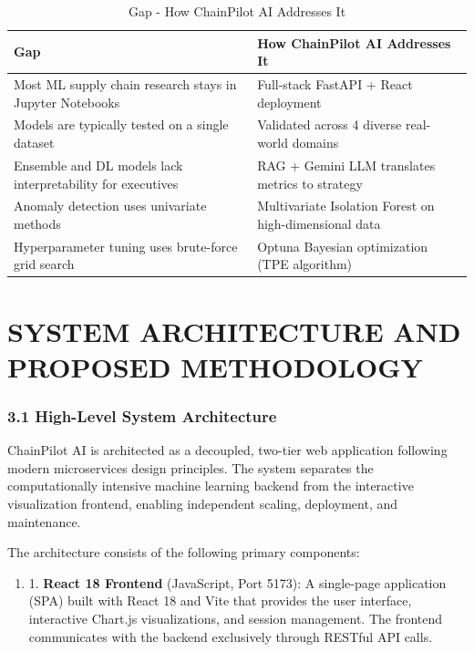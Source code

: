 \documentclass[12pt, a4paper]{report}
\begin{document}
\begin{table}[H]
\centering
\caption{Gap - How ChainPilot AI Addresses It}
\vspace{0.1in}
\begin{tabularx}{\textwidth}{|>{\raggedright\arraybackslash}X|>{\raggedright\arraybackslash}X|}
\hline
Gap & How ChainPilot AI Addresses It \\ \hline
\hline
Most ML supply chain research stays in Jupyter Notebooks & Full-stack FastAPI + React deployment \\ \hline
Models are typically tested on a single dataset & Validated across 4 diverse real-world domains \\ \hline
Ensemble and DL models lack interpretability for executives & RAG + Gemini LLM translates metrics to strategy \\ \hline
Anomaly detection uses univariate methods & Multivariate Isolation Forest on high-dimensional data \\ \hline
Hyperparameter tuning uses brute-force grid search & Optuna Bayesian optimization (TPE algorithm) \\ \hline
\end{tabularx}
\end{table}


\clearpage

\chapter{SYSTEM ARCHITECTURE AND PROPOSED METHODOLOGY}

\subsection{3.1 High-Level System Architecture}

ChainPilot AI is architected as a decoupled, two-tier web application following modern microservices design principles. The system separates the computationally intensive machine learning backend from the interactive visualization frontend, enabling independent scaling, deployment, and maintenance.


The architecture consists of the following primary components:

\begin{enumerate}
\item 1. \textbf{React 18 Frontend} (JavaScript, Port 5173): A single-page application (SPA) built with React 18 and Vite that provides the user interface, interactive Chart.js visualizations, and session management. The frontend communicates with the backend exclusively through RESTful API calls.
\end{enumerate}
\end{document}
